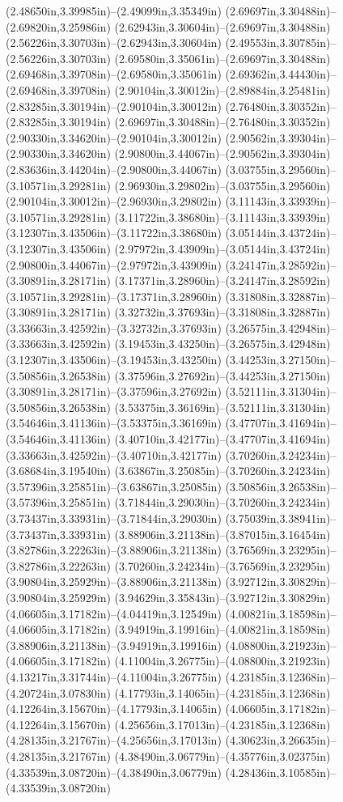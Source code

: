 (2.48650in,3.39985in)--(2.49099in,3.35349in) (2.69697in,3.30488in)--(2.69820in,3.25986in) (2.62943in,3.30604in)--(2.69697in,3.30488in) (2.56226in,3.30703in)--(2.62943in,3.30604in) (2.49553in,3.30785in)--(2.56226in,3.30703in) (2.69580in,3.35061in)--(2.69697in,3.30488in) (2.69468in,3.39708in)--(2.69580in,3.35061in) (2.69362in,3.44430in)--(2.69468in,3.39708in) (2.90104in,3.30012in)--(2.89884in,3.25481in) (2.83285in,3.30194in)--(2.90104in,3.30012in) (2.76480in,3.30352in)--(2.83285in,3.30194in) (2.69697in,3.30488in)--(2.76480in,3.30352in) (2.90330in,3.34620in)--(2.90104in,3.30012in) (2.90562in,3.39304in)--(2.90330in,3.34620in) (2.90800in,3.44067in)--(2.90562in,3.39304in) (2.83636in,3.44204in)--(2.90800in,3.44067in) (3.03755in,3.29560in)--(3.10571in,3.29281in) (2.96930in,3.29802in)--(3.03755in,3.29560in) (2.90104in,3.30012in)--(2.96930in,3.29802in) (3.11143in,3.33939in)--(3.10571in,3.29281in) (3.11722in,3.38680in)--(3.11143in,3.33939in) (3.12307in,3.43506in)--(3.11722in,3.38680in) (3.05144in,3.43724in)--(3.12307in,3.43506in) (2.97972in,3.43909in)--(3.05144in,3.43724in) (2.90800in,3.44067in)--(2.97972in,3.43909in) (3.24147in,3.28592in)--(3.30891in,3.28171in) (3.17371in,3.28960in)--(3.24147in,3.28592in) (3.10571in,3.29281in)--(3.17371in,3.28960in) (3.31808in,3.32887in)--(3.30891in,3.28171in) (3.32732in,3.37693in)--(3.31808in,3.32887in) (3.33663in,3.42592in)--(3.32732in,3.37693in) (3.26575in,3.42948in)--(3.33663in,3.42592in) (3.19453in,3.43250in)--(3.26575in,3.42948in) (3.12307in,3.43506in)--(3.19453in,3.43250in) (3.44253in,3.27150in)--(3.50856in,3.26538in) (3.37596in,3.27692in)--(3.44253in,3.27150in) (3.30891in,3.28171in)--(3.37596in,3.27692in) (3.52111in,3.31304in)--(3.50856in,3.26538in) (3.53375in,3.36169in)--(3.52111in,3.31304in) (3.54646in,3.41136in)--(3.53375in,3.36169in) (3.47707in,3.41694in)--(3.54646in,3.41136in) (3.40710in,3.42177in)--(3.47707in,3.41694in) (3.33663in,3.42592in)--(3.40710in,3.42177in) (3.70260in,3.24234in)--(3.68684in,3.19540in) (3.63867in,3.25085in)--(3.70260in,3.24234in) (3.57396in,3.25851in)--(3.63867in,3.25085in) (3.50856in,3.26538in)--(3.57396in,3.25851in) (3.71844in,3.29030in)--(3.70260in,3.24234in) (3.73437in,3.33931in)--(3.71844in,3.29030in) (3.75039in,3.38941in)--(3.73437in,3.33931in) (3.88906in,3.21138in)--(3.87015in,3.16454in) (3.82786in,3.22263in)--(3.88906in,3.21138in) (3.76569in,3.23295in)--(3.82786in,3.22263in) (3.70260in,3.24234in)--(3.76569in,3.23295in) (3.90804in,3.25929in)--(3.88906in,3.21138in) (3.92712in,3.30829in)--(3.90804in,3.25929in) (3.94629in,3.35843in)--(3.92712in,3.30829in) (4.06605in,3.17182in)--(4.04419in,3.12549in) (4.00821in,3.18598in)--(4.06605in,3.17182in) (3.94919in,3.19916in)--(4.00821in,3.18598in) (3.88906in,3.21138in)--(3.94919in,3.19916in) (4.08800in,3.21923in)--(4.06605in,3.17182in) (4.11004in,3.26775in)--(4.08800in,3.21923in) (4.13217in,3.31744in)--(4.11004in,3.26775in) (4.23185in,3.12368in)--(4.20724in,3.07830in) (4.17793in,3.14065in)--(4.23185in,3.12368in) (4.12264in,3.15670in)--(4.17793in,3.14065in) (4.06605in,3.17182in)--(4.12264in,3.15670in) (4.25656in,3.17013in)--(4.23185in,3.12368in) (4.28135in,3.21767in)--(4.25656in,3.17013in) (4.30623in,3.26635in)--(4.28135in,3.21767in) (4.38490in,3.06779in)--(4.35776in,3.02375in) (4.33539in,3.08720in)--(4.38490in,3.06779in) (4.28436in,3.10585in)--(4.33539in,3.08720in) 